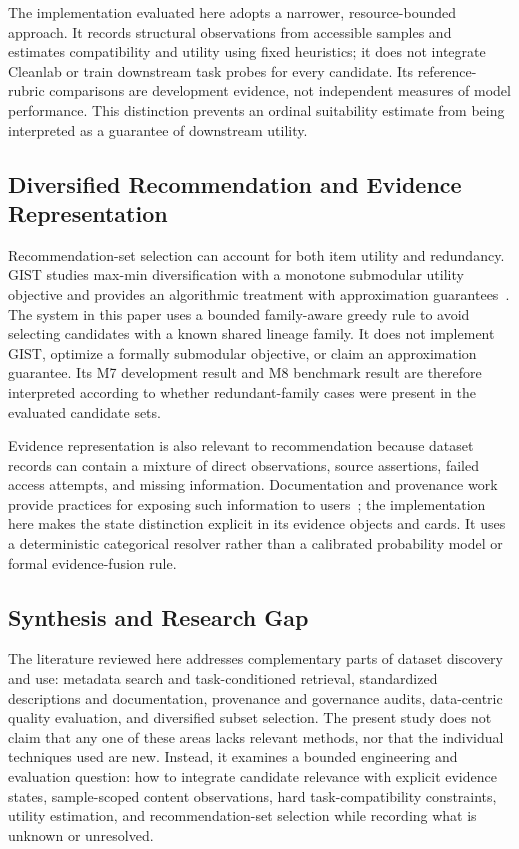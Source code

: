 \documentclass[conference]{IEEEtran}
\begin{document}
The implementation evaluated here adopts a narrower, resource-bounded approach. It records structural observations from accessible samples and estimates compatibility and utility using fixed heuristics; it does not integrate Cleanlab or train downstream task probes for every candidate. Its reference-rubric comparisons are development evidence, not independent measures of model performance. This distinction prevents an ordinal suitability estimate from being interpreted as a guarantee of downstream utility.

\subsection{Diversified Recommendation and Evidence Representation}
Recommendation-set selection can account for both item utility and redundancy. GIST studies max-min diversification with a monotone submodular utility objective and provides an algorithmic treatment with approximation guarantees~\cite{fahrbach2025gist}. The system in this paper uses a bounded family-aware greedy rule to avoid selecting candidates with a known shared lineage family. It does not implement GIST, optimize a formally submodular objective, or claim an approximation guarantee. Its M7 development result and M8 benchmark result are therefore interpreted according to whether redundant-family cases were present in the evaluated candidate sets.

Evidence representation is also relevant to recommendation because dataset records can contain a mixture of direct observations, source assertions, failed access attempts, and missing information. Documentation and provenance work provide practices for exposing such information to users~\cite{pushkarna2022datacards,longpre2023dataprovenance}; the implementation here makes the state distinction explicit in its evidence objects and cards. It uses a deterministic categorical resolver rather than a calibrated probability model or formal evidence-fusion rule.

\subsection{Synthesis and Research Gap}
The literature reviewed here addresses complementary parts of dataset discovery and use: metadata search and task-conditioned retrieval, standardized descriptions and documentation, provenance and governance audits, data-centric quality evaluation, and diversified subset selection. The present study does not claim that any one of these areas lacks relevant methods, nor that the individual techniques used are new. Instead, it examines a bounded engineering and evaluation question: how to integrate candidate relevance with explicit evidence states, sample-scoped content observations, hard task-compatibility constraints, utility estimation, and recommendation-set selection while recording what is unknown or unresolved.
\end{document}
